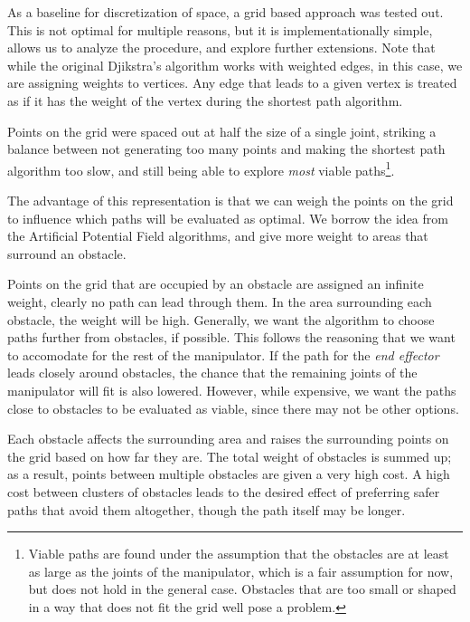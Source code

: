 As a baseline for discretization of space, a grid based approach was tested out. This is not optimal for multiple reasons, but it is implementationally simple, allows us to analyze the procedure, and explore further extensions. Note that while the original Djikstra's algorithm works with weighted edges, in this case, we are assigning weights to vertices. Any edge that leads to a given vertex is treated as if it has the weight of the vertex during the shortest path algorithm.

Points on the grid were spaced out at half the size of a single joint, striking a balance between not generating too many points and making the shortest path algorithm too slow, and still being able to explore \textit{most} viable paths\footnote{Viable paths are found under the assumption that the obstacles are at least as large as the joints of the manipulator, which is a fair assumption for now, but does not hold in the general case. Obstacles that are too small or shaped in a way that does not fit the grid well pose a problem.}.

The advantage of this representation is that we can weigh the points on the grid to influence which paths will be evaluated as optimal. We borrow the idea from the Artificial Potential Field algorithms, and give more weight to areas that surround an obstacle.

Points on the grid that are occupied by an obstacle are assigned an infinite weight, clearly no path can lead through them. In the area surrounding each obstacle, the weight will be high. Generally, we want the algorithm to choose paths further from obstacles, if possible. This follows the reasoning that we want to accomodate for the rest of the manipulator. If the path for the \textit{end effector} leads closely around obstacles, the chance that the remaining joints of the manipulator will fit is also lowered. However, while expensive, we want the paths close to obstacles to be evaluated as viable, since there may not be other options.

Each obstacle affects the surrounding area and raises the surrounding points on the grid based on how far they are. The total weight of obstacles is summed up; as a result, points between multiple obstacles are given a very high cost. A high cost between clusters of obstacles leads to the desired effect of preferring safer paths that avoid them altogether, though the path itself may be longer.

